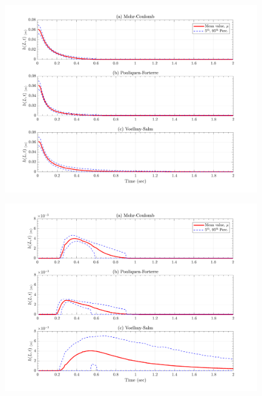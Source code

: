 \documentclass{article}
\begin{document}
\begin{figure}[H]
	\begin{minipage}[b]{0.5\linewidth}
    	\centering
    	\includegraphics[width=1\textwidth]{InclinedPlane/Height/H_L1.png}
    	\label{fig:Ramp-L1-H}
	\end{minipage}
	\begin{minipage}[b]{0.5\linewidth}
		\centering
		\includegraphics[width=1\textwidth]{InclinedPlane/Height/H_L2.png}
    	\label{fig:Ramp-L2-H}
    \end{minipage}


\end{figure}
\end{document}
